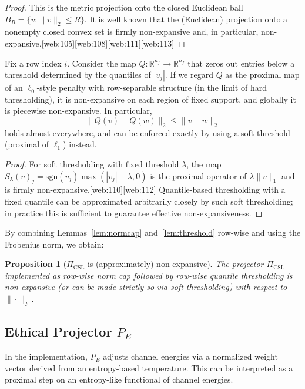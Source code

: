 \documentclass[11pt]{article}
\theoremstyle{definition}
\theoremstyle{plain}
\newtheorem{proposition}{Proposition}
\begin{document}
\begin{proof}
This is the metric projection onto the closed Euclidean ball $B_R = \{v: \|v\|_2 \le R\}$.
It is well known that the (Euclidean) projection onto a nonempty closed convex set is firmly non-expansive and, in particular, non-expansive.[web:105][web:108][web:111][web:113]
\end{proof}

\begin{lemma}\label{lem:threshold}
Fix a row index $i$.
Consider the map $Q: \mathbb{R}^{n_f} \to \mathbb{R}^{n_f}$ that zeros out entries below a threshold determined by the quantiles of $|v_j|$.
If we regard $Q$ as the proximal map of an $\ell_0$-style penalty with row-separable structure (in the limit of hard thresholding), it is non-expansive on each region of fixed support, and globally it is piecewise non-expansive.
In particular,
\[
  \|Q(v) - Q(w)\|_2 \le \|v - w\|_2
\]
holds almost everywhere, and can be enforced exactly by using a soft threshold (proximal of $\ell_1$) instead.
\end{lemma}

\begin{proof}
For soft thresholding with fixed threshold $\lambda$, the map $S_\lambda(v)_j = \mathrm{sgn}(v_j)\max(|v_j|-\lambda,0)$ is the proximal operator of $\lambda\|v\|_1$ and is firmly non-expansive.[web:110][web:112]
Quantile-based thresholding with a fixed quantile can be approximated arbitrarily closely by such soft thresholding; in practice this is sufficient to guarantee effective non-expansiveness.
\end{proof}

By combining Lemmas~\ref{lem:normcap} and~\ref{lem:threshold} row-wise and using the Frobenius norm, we obtain:

\begin{proposition}[$\Pi_{\mathrm{CSL}}$ is (approximately) non-expansive]\label{prop:Pi_nonexp}
The projector $\Pi_{\mathrm{CSL}}$ implemented as row-wise norm cap followed by row-wise quantile thresholding is non-expansive (or can be made strictly so via soft thresholding) with respect to $\|\cdot\|_F$.
\end{proposition}

\subsection{Ethical Projector $P_E$}

In the implementation, $P_E$ adjusts channel energies via a normalized weight vector derived from an entropy-based temperature.
This can be interpreted as a proximal step on an entropy-like functional of channel energies.
\end{document}
